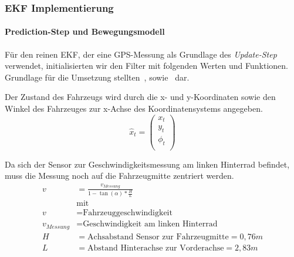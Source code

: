 \documentclass[11pt]{article}
\begin{document}
\subsubsection{EKF Implementierung}\label{EKF-Implementierung}
\paragraph{Prediction-Step und Bewegungsmodell}
Für den reinen EKF, der eine GPS-Messung als Grundlage des \textit{Update-Step} verwendet, initialisierten wir den Filter mit folgenden Werten und Funktionen. Grundlage für die Umsetzung stellten~\cite{ute_SLAM}, sowie~\cite{Freiburg_SLAM_Formeln} dar.

Der Zustand des Fahrzeugs wird durch die x- und y-Koordinaten sowie den Winkel des Fahrzeuges zur x-Achse des Koordinatensystems angegeben.
\begin{equation}\label{EKF-State-Vector}
	\hat{x}_t = \begin{pmatrix}
		x_t \\
		y_t \\
		\phi_t \\
	  \end{pmatrix}
\end{equation}

Da sich der Sensor zur Geschwindigkeitsmessung am linken Hinterrad befindet, muss die Messung noch auf die Fahrzeugmitte zentriert werden.
\begin{equation}\label{Geschwindikeit}
\begin{split}
	v &= \frac{v_{Messung}}{1-\tan(\alpha)*\frac{H}{L}} \\
	&\text{mit } \\
	v &= \text{Fahrzeuggeschwindigkeit} \\
	v_{Messung} &= \text{Geschwindigkeit am linken Hinterrad} \\
	H &= \text{Achsabstand Sensor zur Fahrzeugmitte} = 0,76m \\
	L &= \text{Abstand Hinterachse zur Vorderachse} = 2,83m
\end{split}
\end{equation}
\end{document}
